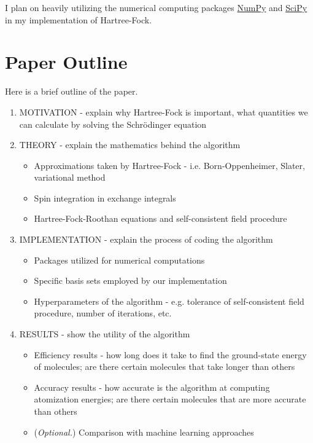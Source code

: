 \documentclass[12pt]{article}
\begin{document}
I plan on heavily utilizing the numerical computing packages \href{http://www.numpy.org/}{NumPy} and \href{https://www.scipy.org/}{SciPy} in my implementation of Hartree-Fock.  

\section{Paper Outline}
Here is a brief outline of the paper.
\begin{enumerate}
\item MOTIVATION - explain why Hartree-Fock is important, what quantities we can calculate by solving the Schr\"odinger equation
\item THEORY - explain the mathematics behind the algorithm
\begin{itemize}
\item Approximations taken by Hartree-Fock - i.e. Born-Oppenheimer, Slater, variational method
\item Spin integration in exchange integrals
\item  Hartree-Fock-Roothan equations and self-consistent field procedure
\end{itemize}
\item IMPLEMENTATION - explain the process of coding the algorithm
\begin{itemize}
\item Packages utilized for numerical computations
\item Specific basis sets employed by our implementation
\item Hyperparameters of the algorithm - e.g. tolerance of self-consistent field procedure, number of iterations, etc. 
\end{itemize}
\item RESULTS - show the utility of the algorithm
\begin{itemize}
\item Efficiency results - how long does it take to find the ground-state energy of molecules; are there certain molecules that take longer than others
\item Accuracy results - how accurate is the algorithm at computing atomization energies; are there certain molecules that are more accurate than others
\item (\emph{Optional.}) Comparison with machine learning approaches
\end{itemize}
\end{enumerate}



\end{document}
